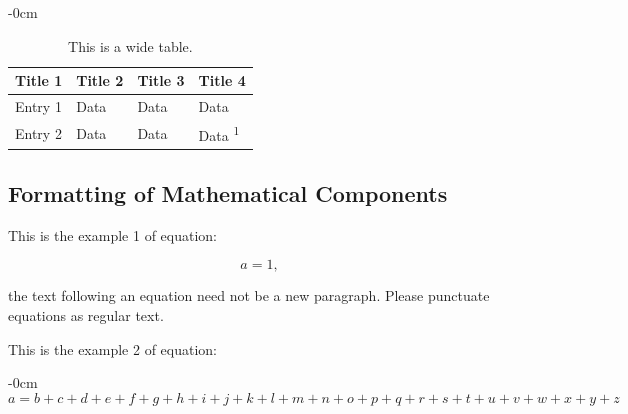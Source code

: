 \documentclass[mathematics,article,submit,pdftex,moreauthors]{Definitions/mdpi}
\begin{document}
\begin{table}[H]
\caption{This is a wide table.\label{tab2}}
	\begin{adjustwidth}{-\extralength}{0cm}
		\begin{tabularx}{\fulllength}{CCCC}
			\toprule
			\textbf{Title 1}	& \textbf{Title 2}	& \textbf{Title 3}     & \textbf{Title 4}\\
			\midrule
			Entry 1		& Data			& Data			& Data\\
			Entry 2		& Data			& Data			& Data \textsuperscript{1}\\
			\bottomrule
		\end{tabularx}
	\end{adjustwidth}
\end{table}


\subsection{Formatting of Mathematical Components}

This is the example 1 of equation:
\begin{linenomath}
\begin{equation}
a = 1,
\end{equation}
\end{linenomath}
the text following an equation need not be a new paragraph. Please punctuate equations as regular text.

This is the example 2 of equation:
\begin{adjustwidth}{-\extralength}{0cm}
\begin{equation}
a = b + c + d + e + f + g + h + i + j + k + l + m + n + o + p + q + r + s + t + u + v + w + x + y + z
\end{equation}
\end{adjustwidth}
\end{document}
